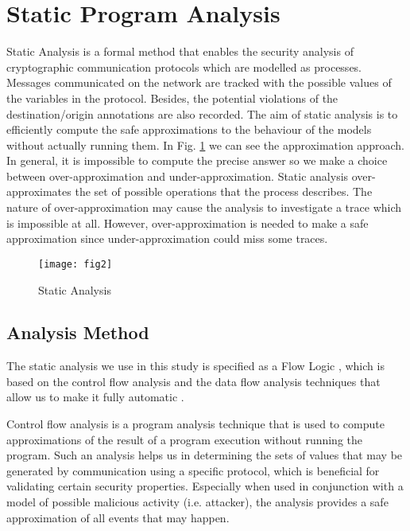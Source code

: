 \section{Static Program Analysis}
\label{zig:static}
Static Analysis is a formal method that enables the security analysis of cryptographic communication protocols which are modelled as \LYSA processes. 
Messages communicated on the network are tracked with the possible values of the variables in the protocol. 
Besides, the potential violations of the destination/origin annotations are also recorded.
The aim of static analysis is to efficiently compute the safe approximations to the behaviour of the models without actually running them.
In Fig. \ref{fig:stat} we can see the approximation approach.
In general, it is impossible to compute the precise answer so we make a choice between over-approximation and under-approximation.
Static analysis over-approximates the set of possible operations that the \LYSA process describes.
The nature of over-approximation may cause the analysis to investigate a trace which is impossible at all.  
However, over-approximation is needed to make a safe approximation since under-approximation could miss some traces.

\begin{figure}[!htp]
\centering
\texttt{[image: fig2]}
\caption{Static Analysis}
\label{fig:stat}
\end{figure}

\subsection{Analysis Method}

The static analysis we use in this study is specified as a Flow Logic
\cite{bod:2,bod:1}, which is based on the control flow analysis and
the data flow analysis techniques that allow us to make it fully
automatic \cite{nie:nie:han}. 

Control flow analysis is a program analysis technique that is used to
compute approximations of the result of a program execution without
running the program. Such an analysis helps us in determining the sets
of values that may be generated by communication using a specific
protocol, which is beneficial for validating certain security
properties. Especially when used in conjunction with a model of
possible malicious activity (i.e. attacker), the analysis provides a
safe approximation of all events that may happen.

